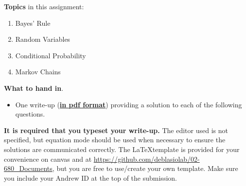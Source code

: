 \noindent 
{\bf Topics} in this assignment: 
\begin{enumerate}
\item Bayes' Rule
\item Random Variables
\item Conditional Probability 
\item Markov Chains
\end{enumerate}
\vspace{0.2in}


\noindent 
{\bf What to hand in}. 
\begin{itemize}
\item One write-up (\underline{\textbf{in pdf format}}) providing a solution to each of the following questions.
\end{itemize}

\textbf{It is required that you typeset your write-up.} 
The editor used is not specified, but equation mode should be used when necessary to ensure the solutions are communicated correctly.
The \LaTeX template is provided for your convenience on canvas and at \url{https://github.com/deblasiolab/02-680_Documents}, but you are free to use/create your own template. 
Make sure you include your Andrew ID at the top of the submission.\\

